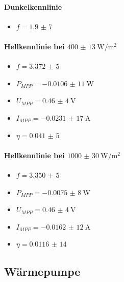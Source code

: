 \documentclass[english, ngerman]{scrartcl}
\begin{document}
\paragraph{Dunkelkennlinie}
\begin{itemize}
    \item $f = \num{1,9(7)}$
\end{itemize}
\paragraph{Hellkennlinie bei $\SI{400(13)}{\watt\per\square\meter}$}
\begin{itemize}
    \item $f = \num{3,372(5)}$
    \item $P_{MPP} = \SI{-0,0106(11)}{\watt}$
    \item $U_{MPP} = \SI{0,46(4)}{\volt}$
    \item $I_{MPP} = \SI{-0,0231(17)}{\ampere}$
    \item $\eta = \num{0,041(5)}$
\end{itemize}
\paragraph{Hellkennlinie bei $\SI{1000(30)}{\watt\per\square\meter}$}
\begin{itemize}
    \item $f = \num{3,350(5)}$
    \item $P_{MPP} = \SI{-0,0075(8)}{\watt}$
    \item $U_{MPP} = \SI{0,46(4)}{\volt}$
    \item $I_{MPP} = \SI{-0,0162(12)}{\ampere}$
    \item $\eta = \num{0,0116(14)}$
\end{itemize}
\subsection{Wärmepumpe}
\label{subsec:zusammenfassung_waermepumpe}
\clearpage
\printbibliography

\listoffigures

\listoftables
\end{document}
